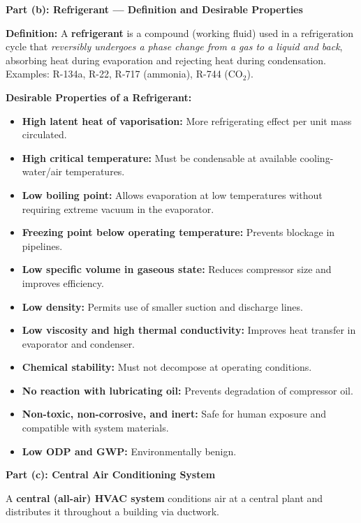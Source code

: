\documentclass[12pt,a3paper]{article}
\begin{document}
\begin{enumerate}
\begin{tcolorbox}[enhanced,breakable,ansbox,colback=cC!4,colframe=cC,
  boxrule=0.8pt,arc=5pt,
  title={\textbf{Solution}},fonttitle=\bfseries\color{white},colbacktitle=cC]
\textbf{Part (b): Refrigerant — Definition and Desirable Properties}

\textbf{Definition:}
A \textbf{refrigerant} is a compound (working fluid) used in a refrigeration
cycle that \emph{reversibly undergoes a phase change from a gas to a liquid
and back}, absorbing heat during evaporation and rejecting heat during
condensation. Examples: R-134a, R-22, R-717 (ammonia), R-744 (CO$_2$).

\textbf{Desirable Properties of a Refrigerant:}
\begin{itemize}[leftmargin=1.5em,itemsep=2pt]
  \item \textbf{High latent heat of vaporisation:} More refrigerating effect
        per unit mass circulated.
  \item \textbf{High critical temperature:} Must be condensable at available
        cooling-water/air temperatures.
  \item \textbf{Low boiling point:} Allows evaporation at low temperatures
        without requiring extreme vacuum in the evaporator.
  \item \textbf{Freezing point below operating temperature:} Prevents
        blockage in pipelines.
  \item \textbf{Low specific volume in gaseous state:} Reduces compressor
        size and improves efficiency.
  \item \textbf{Low density:} Permits use of smaller suction and discharge
        lines.
  \item \textbf{Low viscosity and high thermal conductivity:} Improves heat
        transfer in evaporator and condenser.
  \item \textbf{Chemical stability:} Must not decompose at operating
        conditions.
  \item \textbf{No reaction with lubricating oil:} Prevents degradation
        of compressor oil.
  \item \textbf{Non-toxic, non-corrosive, and inert:} Safe for human
        exposure and compatible with system materials.
  \item \textbf{Low ODP and GWP:} Environmentally benign.
\end{itemize}

\hrulefill

\textbf{Part (c): Central Air Conditioning System}

A \textbf{central (all-air) HVAC system} conditions air at a central plant
and distributes it throughout a building via ductwork.


\end{tcolorbox}
\end{enumerate}
\end{document}
